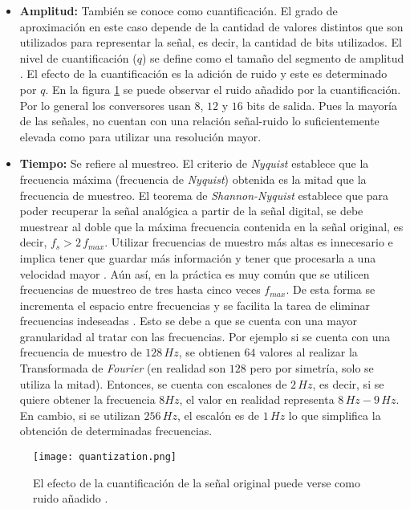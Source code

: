 \begin{itemize}
\item \textbf{Amplitud:} También se conoce como cuantificación. El grado de aproximación en este caso depende de la cantidad de valores distintos que son utilizados para representar la señal, es decir, la cantidad de bits utilizados. El nivel de cuantificación ($q$) se define como el tamaño del segmento de amplitud . El efecto de la cuantificación es la adición de ruido y este es determinado por $q$. En la figura \ref{fig:quantization} se puede observar el ruido añadido por la cuantificación. Por lo general los conversores usan $8$, $12$ y $16$ bits de salida. Pues la mayoría de las señales, no cuentan con una relación señal-ruido lo suficientemente elevada como para utilizar una resolución mayor.
\item \textbf{Tiempo:} Se refiere al muestreo. El criterio de \emph{Nyquist} establece que la frecuencia máxima (frecuencia de \emph{Nyquist}) obtenida es la mitad que la frecuencia de muestreo. El teorema de \emph{Shannon-Nyquist} establece que para poder recuperar la señal analógica a partir de la señal digital, se debe muestrear al doble que la máxima frecuencia contenida en la señal original, es decir, $ f_{s} > 2\, f_{max} $. Utilizar frecuencias de muestro más altas es innecesario e implica tener que guardar más información y tener que procesarla a una velocidad mayor .  Aún así, en la práctica es muy común que se utilicen frecuencias de muestreo de tres hasta cinco veces $f_{max}$. De esta forma se incrementa el espacio entre frecuencias y se facilita la tarea de eliminar frecuencias indeseadas \cite{biosignal-book}. Esto se debe a que se cuenta con una mayor granularidad al tratar con las frecuencias. Por ejemplo si se cuenta con una frecuencia de muestro de $128 \, Hz$, se obtienen $64$ valores al realizar la Transformada de \emph{Fourier} (en realidad son $128$ pero por simetría, solo se utiliza la mitad). Entonces, se cuenta con escalones de $2 \, Hz$, es decir, si se quiere obtener la frecuencia $ 8 Hz$, el valor en realidad representa $ 8 \, Hz - 9 \, Hz$. En cambio, si se utilizan $256 \, Hz$, el escalón es de $ 1 \, Hz$ lo que simplifica la obtención de determinadas frecuencias.
\end{itemize}

\begin{figure}[H]
	\centering
    \texttt{[image: quantization.png]}
    \caption{El efecto de la cuantificación de la señal original puede verse como ruido añadido \cite{biosignal-book}.}
	\label{fig:quantization}
\end{figure}

